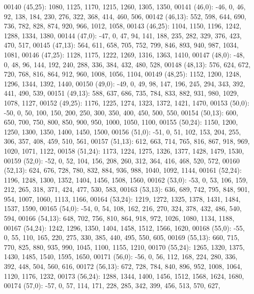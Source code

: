 \begin{DoxyCode}
00140       (45,25): 1080, 1125, 1170, 1215, 1260, 1305, 1350,
00141       (46,0): -46, 0, 46, 92, 138, 184, 230, 276, 322, 368, 414, 460, 506,
00142       (46,13): 552, 598, 644, 690, 736, 782, 828, 874, 920, 966, 1012, 1058,
00143       (46,25): 1104, 1150, 1196, 1242, 1288, 1334, 1380,
00144       (47,0): -47, 0, 47, 94, 141, 188, 235, 282, 329, 376, 423, 470, 517,
00145       (47,13): 564, 611, 658, 705, 752, 799, 846, 893, 940, 987, 1034, 1081,
00146       (47,25): 1128, 1175, 1222, 1269, 1316, 1363, 1410,
00147       (48,0): -48, 0, 48, 96, 144, 192, 240, 288, 336, 384, 432, 480, 528,
00148       (48,13): 576, 624, 672, 720, 768, 816, 864, 912, 960, 1008, 1056, 1104,
00149       (48,25): 1152, 1200, 1248, 1296, 1344, 1392, 1440,
00150       (49,0): -49, 0, 49, 98, 147, 196, 245, 294, 343, 392, 441, 490, 539,
00151       (49,13): 588, 637, 686, 735, 784, 833, 882, 931, 980, 1029, 1078, 1127,
00152       (49,25): 1176, 1225, 1274, 1323, 1372, 1421, 1470,
00153       (50,0): -50, 0, 50, 100, 150, 200, 250, 300, 350, 400, 450, 500, 550,
00154       (50,13): 600, 650, 700, 750, 800, 850, 900, 950, 1000, 1050, 1100,
00155       (50,24): 1150, 1200, 1250, 1300, 1350, 1400, 1450, 1500,
00156       (51,0): -51, 0, 51, 102, 153, 204, 255, 306, 357, 408, 459, 510, 561,
00157       (51,13): 612, 663, 714, 765, 816, 867, 918, 969, 1020, 1071, 1122,
00158       (51,24): 1173, 1224, 1275, 1326, 1377, 1428, 1479, 1530,
00159       (52,0): -52, 0, 52, 104, 156, 208, 260, 312, 364, 416, 468, 520, 572,
00160       (52,13): 624, 676, 728, 780, 832, 884, 936, 988, 1040, 1092, 1144,
00161       (52,24): 1196, 1248, 1300, 1352, 1404, 1456, 1508, 1560,
00162       (53,0): -53, 0, 53, 106, 159, 212, 265, 318, 371, 424, 477, 530, 583,
00163       (53,13): 636, 689, 742, 795, 848, 901, 954, 1007, 1060, 1113, 1166,
00164       (53,24): 1219, 1272, 1325, 1378, 1431, 1484, 1537, 1590,
00165       (54,0): -54, 0, 54, 108, 162, 216, 270, 324, 378, 432, 486, 540, 594,
00166       (54,13): 648, 702, 756, 810, 864, 918, 972, 1026, 1080, 1134, 1188,
00167       (54,24): 1242, 1296, 1350, 1404, 1458, 1512, 1566, 1620,
00168       (55,0): -55, 0, 55, 110, 165, 220, 275, 330, 385, 440, 495, 550, 605,
00169       (55,13): 660, 715, 770, 825, 880, 935, 990, 1045, 1100, 1155, 1210,
00170       (55,24): 1265, 1320, 1375, 1430, 1485, 1540, 1595, 1650,
00171       (56,0): -56, 0, 56, 112, 168, 224, 280, 336, 392, 448, 504, 560, 616,
00172       (56,13): 672, 728, 784, 840, 896, 952, 1008, 1064, 1120, 1176, 1232,
00173       (56,24): 1288, 1344, 1400, 1456, 1512, 1568, 1624, 1680,
00174       (57,0): -57, 0, 57, 114, 171, 228, 285, 342, 399, 456, 513, 570, 627,

\end{DoxyCode}
